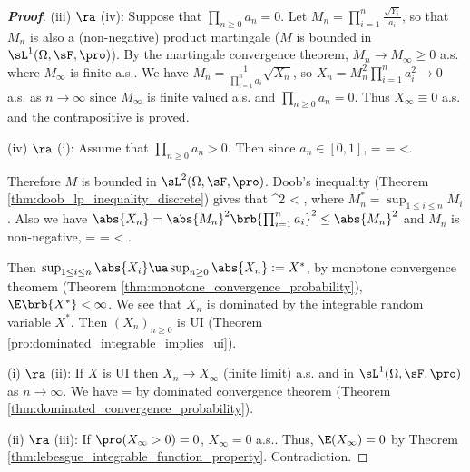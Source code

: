 \begin{proof}[\bf Proof]
(iii) $\ra$ (iv): Suppose that $\prod_{n\geq 0} a_n = 0$. Let $M_n = \prod^n_{i=1} \frac{\sqrt{Y_i}}{a_i}$, so that $M_n$ is also a (non-negative) product martingale ($M$ is bounded in $\sL^1(\Omega,\sF,\pro)$). By the martingale convergence theorem, $M_n \to  M_\infty \geq 0$ a.s. where $M_\infty$ is finite a.s.. We have $M_n = \frac 1{\prod^n_{i=1} a_i }\sqrt{X_n}$, so $X_n = M^2_n \prod^n_{i=1} a^2_i \to 0$ a.s. as $n \to \infty$ since $M_\infty$ is finite valued a.s. and $\prod_{n \geq0} a_n = 0$. Thus $X_\infty \equiv 0$ a.s. and the contrapositive is proved.

(iv) $\ra$ (i): Assume that $\prod_{n\geq0} a_n > 0$. Then since $a_n \in [0,1]$,
\be
\E{} = \E{} =  \leq {} <\infty.
\ee

Therefore $M$ is bounded in $\sL^2(\Omega,\sF,\pro)$. Doob's inequality (Theorem \ref{thm:doob_lp_inequality_discrete}) gives that
\be
\E{} \leq {}^2 \E{} \leq {} < \infty,
\ee
where $M^*_n = \sup_{1\leq i\leq n} M_i$. Also we have $\abs{X_n} = \abs{M_n}^2 \brb{\prod^n_{i=1}a_i}^2 \leq \abs{M_n}^2$ and $M_n$ is non-negative,
\be
\E {} \leq \E {} = \E {} = \E{}  < \infty.
\ee

Then $\sup_{1\leq i\leq n}\abs{X_i} \ua \sup_{n\geq 0}\abs{X_n} := X^*$, by monotone convergence theomem (Theorem \ref{thm:monotone_convergence_probability}), $\E\brb{X^*} < \infty$.
We see that $X_n$ is dominated by the integrable random variable $X^*$. Then  $(X_n)_{n \geq 0}$ is UI (Theorem \ref{pro:dominated_integrable_implies_ui}).

(i) $\ra$ (ii): If $X$ is UI then $X_n \to  X_\infty$ (finite limit) a.s. and in $\sL^1(\Omega,\sF,\pro)$ as $n \to \infty$. We have
 = \E{}\to \E{}
\ee
by dominated convergence theorem (Theorem \ref{thm:dominated_convergence_probability}).

(ii) $\ra$ (iii): If $\pro(X_\infty >0) = 0$, $X_\infty = 0$ a.s.. Thus, $\E(X_\infty)= 0$ by Theorem \ref{thm:lebesgue_integrable_function_property}. Contradiction. %
\end{proof}

